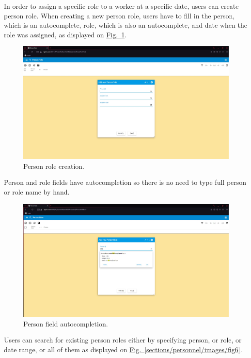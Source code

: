 In order to assign a specific role to a worker at a specific date, users can create person role. When creating a new person role, users have to fill in the person, which is an autocomplete, role, which is also an autocomplete, and date when the role was assigned, as displayed on
\hyperref[sections/personnel/images/fig7]{Fig.~\ref*{sections/personnel/images/fig7}}.

\begin{figure}[!htbp]
\centering
\includegraphics[width=0.95\linewidth]{sections/personnel/images/fig7.jpg}
\caption{Person role creation.}\label{sections/personnel/images/fig7}
\end{figure}

\newpage
Person and role fields have autocompletion so there is no need to type full person or role name by hand.

\begin{figure}[!htbp]
\centering
\includegraphics[width=0.95\linewidth]{sections/personnel/images/fig8.jpg}
\caption{Person field autocompletion.}\label{sections/personnel/images/fig8}
\end{figure}

\newpage
Users can search for existing person roles either by specifying person, or role, or date range, or all of them as displayed on \hyperref[sections/personnel/images/fig6]{Fig.~\ref*{sections/personnel/images/fig6}}.

